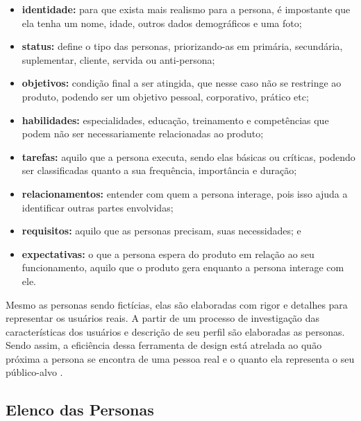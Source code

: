 \begin{itemize}
    \item \textbf{identidade:} para que exista mais realismo para a persona, é impostante que ela tenha um nome, idade, outros dados demográficos e uma foto;

    \item \textbf{status:} define o tipo das personas, priorizando-as em primária, secundária, suplementar, cliente, servida ou anti-persona;

    \item \textbf{objetivos:} condição final a ser atingida, que nesse caso não se restringe ao produto, podendo ser um objetivo pessoal, corporativo, prático etc;

    \item \textbf{habilidades:} especialidades, educação, treinamento e competências que podem não ser necessariamente relacionadas ao produto; 

    \item \textbf{tarefas:} aquilo que a persona executa, sendo elas básicas ou críticas, podendo ser classificadas quanto a sua frequência, importância e duração;
    
    \item \textbf{relacionamentos:} entender com quem a persona interage, pois isso ajuda a identificar outras partes envolvidas;
    
    \item \textbf{requisitos:} aquilo que as personas precisam, suas necessidades; e
    
    \item \textbf{expectativas:} o que a persona espera do produto em relação ao seu funcionamento, aquilo que o produto gera enquanto a persona interage com ele.
\end{itemize}

Mesmo as personas sendo fictícias, elas são elaboradas com rigor e detalhes para representar os usuários reais. A partir de um processo de investigação das características dos usuários e descrição de seu perfil são elaboradas as personas. Sendo assim, a eficiência dessa ferramenta de design está atrelada ao quão próxima a persona se encontra de uma pessoa real e o quanto ela representa o seu público-alvo \cite[p. 177]{barbosa_silva}. %

\subsection{Elenco das Personas}

